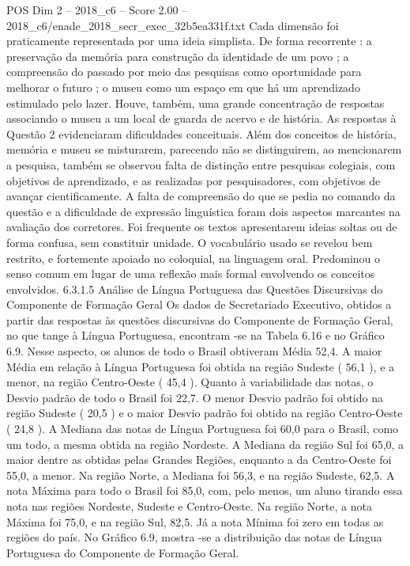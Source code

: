 \begin{textsample}{POS Dim 2 – 2018\_c6 – Score 2.00 – 2018\_c6/enade\_2018\_secr\_exec\_32b5ea331f.txt}
Cada dimensão foi praticamente representada por uma ideia simplista.
De forma recorrente : a preservação da memória para construção da identidade de um povo ; a compreensão do passado por meio das pesquisas como oportunidade para melhorar o futuro ; o museu como um espaço em que há um aprendizado estimulado pelo lazer.
Houve, também, uma grande concentração de respostas associando o museu a um local de guarda de acervo e de história.
As respostas à Questão 2 evidenciaram dificuldades conceituais.
Além dos conceitos de história, memória e museu se misturarem, parecendo não se distinguirem, ao mencionarem a pesquisa, também se observou falta de distinção entre pesquisas colegiais, com objetivos de aprendizado, e as realizadas por pesquisadores, com objetivos de avançar cientificamente.
A falta de compreensão do que se pedia no comando da questão e a dificuldade de expressão linguística foram dois aspectos marcantes na avaliação dos corretores.
Foi frequente os textos apresentarem ideias soltas ou de forma confusa, sem constituir unidade.
O vocabulário usado se revelou bem restrito, e fortemente apoiado no coloquial, na linguagem oral.
Predominou o senso comum em lugar de uma reflexão mais formal envolvendo os conceitos envolvidos. 6.3.1.5 Análise de Língua Portuguesa das Questões Discursivas do Componente de Formação Geral Os dados de Secretariado Executivo, obtidos a partir das respostas às questões discursivas do Componente de Formação Geral, no que tange à Língua Portuguesa, encontram -se na Tabela 6.16 e no Gráfico 6.9.
Nesse aspecto, os alunos de todo o Brasil obtiveram Média 52,4.
A maior Média em relação à Língua Portuguesa foi obtida na região Sudeste ( 56,1 ), e a menor, na região Centro-Oeste ( 45,4 ).
Quanto à variabilidade das notas, o Desvio padrão de todo o Brasil foi 22,7.
O menor Desvio padrão foi obtido na região Sudeste ( 20,5 ) e o maior Desvio padrão foi obtido na região Centro-Oeste ( 24,8 ).
A Mediana das notas de Língua Portuguesa foi 60,0 para o Brasil, como um todo, a mesma obtida na região Nordeste.
A Mediana da região Sul foi 65,0, a maior dentre as obtidas pelas Grandes Regiões, enquanto a da Centro-Oeste foi 55,0, a menor.
Na região Norte, a Mediana foi 56,3, e na região Sudeste, 62,5.
A nota Máxima para todo o Brasil foi 85,0, com, pelo menos, um aluno tirando essa nota nas regiões Nordeste, Sudeste e Centro-Oeste.
Na região Norte, a nota Máxima foi 75,0, e na região Sul, 82,5.
Já a nota Mínima foi zero em todas as regiões do país.
No Gráfico 6.9, mostra -se a distribuição das notas de Língua Portuguesa do Componente de Formação Geral.

\end{textsample}
